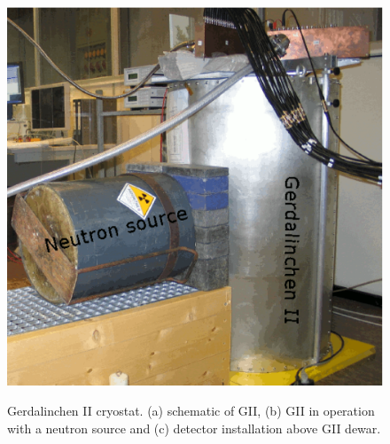 \begin{figure}[tbhp]
{\includegraphics[height=0.25\textheight]{GIIneutron}}\hfil%
%
\caption{Gerdalinchen II cryostat. (a) schematic of GII, (b) GII in operation with a neutron source and (c) detector installation above GII dewar.}
\label{fig:tt:gii}
\end{figure}

